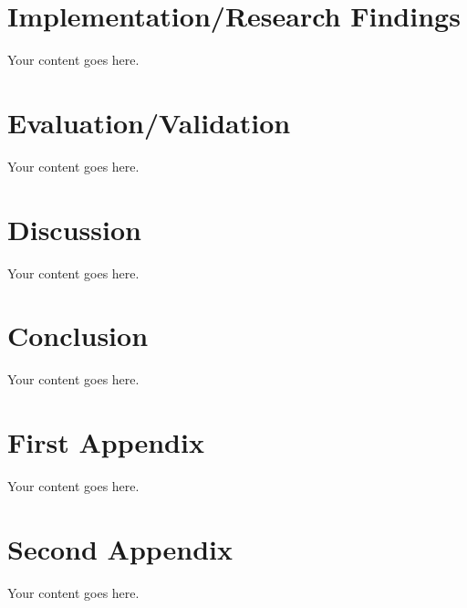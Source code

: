 \documentclass[12pt,lot,lof]{quthesis}
\begin{document}
\chapter{Implementation/Research Findings}
Your content goes here.

\chapter{Evaluation/Validation}
Your content goes here.

\chapter{Discussion}
Your content goes here.

\chapter{Conclusion}
Your content goes here.

{
\singlespacing


\cleardoublepage
\ifdefined{}
\else
\fi
{}


}


\begin{appendices}



\chapter{First Appendix}
Your content goes here.

\chapter{Second Appendix}
Your content goes here.

\end{appendices}
\end{document}

